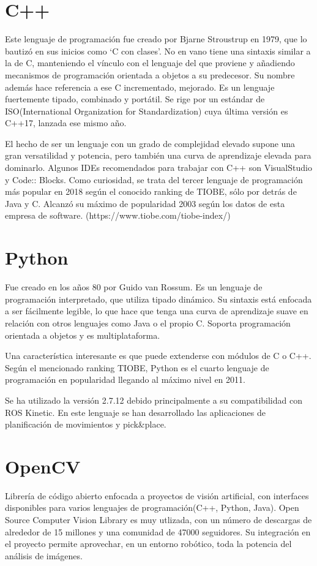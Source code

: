 \documentclass[12pt,spanish,chapterprefix, numbers=noenddot]{book}
\numberwithin{equation}{section}
\numberwithin{figure}{section}
\begin{document}
\section{C++}
Este lenguaje de programación fue creado por Bjarne Stroustrup en 1979, que lo bautizó en sus inicios como ‘C con clases’. No en vano tiene una sintaxis similar a la de C, manteniendo el vínculo con el lenguaje del que proviene y añadiendo mecanismos de programación orientada a objetos a su predecesor. Su nombre además hace referencia a ese C incrementado, mejorado. 
Es un lenguaje fuertemente tipado, combinado y portátil. Se rige por un estándar de ISO(International Organization for Standardization) cuya última versión es C++17, lanzada ese mismo año. 

El hecho de ser un lenguaje con un grado de complejidad elevado supone una gran versatilidad y potencia, pero también una curva de aprendizaje elevada para dominarlo.
Algunos IDEs recomendados para trabajar con C++ son VisualStudio y Code:: Blocks. 
Como curiosidad, se trata del tercer lenguaje de programación más popular en 2018 según el conocido ranking de TIOBE, sólo por detrás de Java y C. Alcanzó su máximo de popularidad 2003 según los datos de esta empresa de software. (https://www.tiobe.com/tiobe-index/)

\section{Python}
Fue creado en los años 80 por Guido van Rossum. Es un lenguaje de programación interpretado, que utiliza tipado dinámico. Su sintaxis está enfocada a ser fácilmente legible, lo que hace que tenga una curva de aprendizaje suave en relación con otros lenguajes como Java o el propio C. Soporta programación orientada a objetos y es multiplataforma.

Una característica interesante es que puede extenderse con módulos de C o C++.
Según el mencionado ranking TIOBE, Python es el cuarto lenguaje de programación en popularidad llegando al máximo nivel en 2011. 

Se ha utilizado la versión 2.7.12 debido principalmente a su compatibilidad con ROS Kinetic. En este lenguaje se han desarrollado las aplicaciones de planificación de movimientos y pick\&place. 

\section{OpenCV}
Librería de código abierto enfocada a proyectos de visión artificial, con interfaces disponibles para varios lenguajes de programación(C++, Python, Java). 
Open Source Computer Vision Library es muy utlizada, con un número de descargas de alrededor de 15 millones y una comunidad de 47000 seguidores.  
Su integración en el proyecto permite aprovechar, en un entorno robótico, toda la potencia del análisis de imágenes. 
\end{document}
